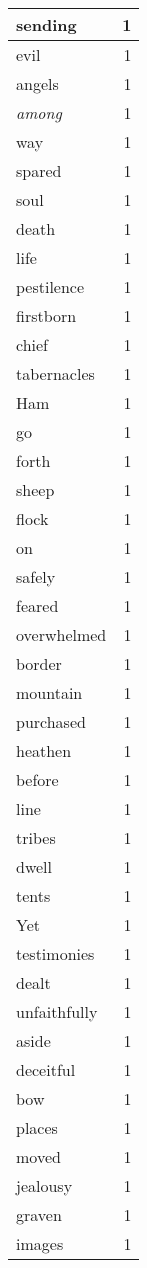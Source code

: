 \begin{center}
\begin{longtable}{l|r}
sending & 1\\ \hline 
evil & 1\\ \hline 
angels & 1\\ \hline 
\emph{among} & 1\\ \hline 
way & 1\\ \hline 
spared & 1\\ \hline 
soul & 1\\ \hline 
death & 1\\ \hline 
life & 1\\ \hline 
pestilence & 1\\ \hline 
firstborn & 1\\ \hline 
chief & 1\\ \hline 
tabernacles & 1\\ \hline 
Ham & 1\\ \hline 
go & 1\\ \hline 
forth & 1\\ \hline 
sheep & 1\\ \hline 
flock & 1\\ \hline 
on & 1\\ \hline 
safely & 1\\ \hline 
feared & 1\\ \hline 
overwhelmed & 1\\ \hline 
border & 1\\ \hline 
mountain & 1\\ \hline 
purchased & 1\\ \hline 
heathen & 1\\ \hline 
before & 1\\ \hline 
line & 1\\ \hline 
tribes & 1\\ \hline 
dwell & 1\\ \hline 
tents & 1\\ \hline 
Yet & 1\\ \hline 
testimonies & 1\\ \hline 
dealt & 1\\ \hline 
unfaithfully & 1\\ \hline 
aside & 1\\ \hline 
deceitful & 1\\ \hline 
bow & 1\\ \hline 
places & 1\\ \hline 
moved & 1\\ \hline 
jealousy & 1\\ \hline 
graven & 1\\ \hline 
images & 1\\ \hline 

\end{longtable}
\end{center}
